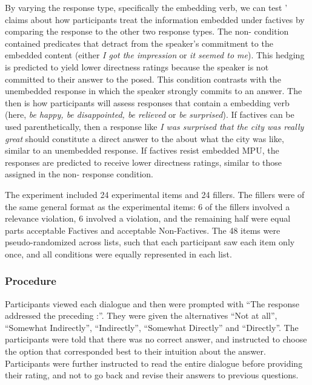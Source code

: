 \documentclass[output=paper]{langsci/langscibook}
\begin{document}
By varying the response type, specifically the embedding verb, we can test
\citeauthor{Simons2007}' claims about how participants treat the information embedded under
factives by comparing the  response to the other two response types.
The non- condition contained predicates that detract from the speaker's
commitment to the embedded content (either \textit{I got the impression} or
\textit{it seemed to me}).  This hedging is predicted to yield lower
directness ratings because the speaker is not committed to their answer to the
 posed.  This condition contrasts with the unembedded response in which
the speaker strongly commits to an answer.  The  then is how
participants will assess responses that contain a  embedding verb (here,
\textit{be happy, be disappointed, be relieved} or \textit{be surprised}).  If
factives can be used parenthetically, then a response like {\itshape I was surprised
that the city was really great} should constitute a direct answer to the
 about what the city was like, similar to an unembedded response.  If
factives resist embedded MPU, the  responses are predicted to receive
lower directness ratings, similar to those assigned in the non- response condition. 

The experiment included 24 experimental items and 24 fillers. The fillers were of the same general format as the experimental items: 6 of the fillers involved a relevance violation, 6 involved a  violation, and the remaining half were equal parts acceptable Factives and acceptable Non-Factives. The 48 items were pseudo-randomized across lists, such that each participant saw each item only once, and all conditions were equally represented in each list. 


\subsubsection{Procedure}

Participants viewed each dialogue and then were prompted with ``The response address\-ed the preceding :''. They were given the alternatives ``Not at all'', ``Somewhat Indirectly'', ``Indirectly'', ``Somewhat Directly'' and ``Directly''. The participants were told that there was no correct answer, and instructed to choose the option that corresponded best to their intuition about the answer. Participants were further instructed to read the entire dialogue before providing their rating, and not to go back and revise their answers to previous questions.
\end{document}
